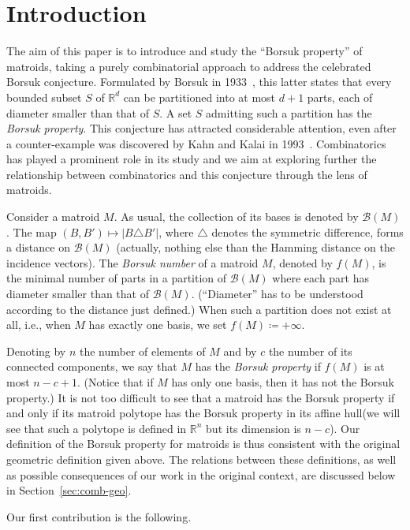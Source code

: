 \documentclass[12pt]{amsart}
\theoremstyle{plain}
\theoremstyle{definition}
\theoremstyle{remark}
\newcommand{\R}{\mathbb{R}}
\def \B {\mathcal{B}}
\begin{document}
\section{Introduction}\label{sec:intro}

The aim of this paper is to introduce and study the ``Borsuk property'' of matroids, taking a purely combinatorial approach to address the celebrated Borsuk conjecture. Formulated by Borsuk in 1933~\cite{borsuk1933drei}, this latter states that every bounded subset $S$ of $\R^d$ can be partitioned into at most $d+1$ parts, each of diameter smaller than that of $S$. A set $S$ admitting such a partition has the {\em Borsuk property}. This conjecture has attracted considerable attention, even after a counter-example was discovered by Kahn and Kalai in 1993~\cite{kahn1993counterexample}. Combinatorics has played a prominent role in its study and we aim at exploring further the relationship between combinatorics and this conjecture through the lens of matroids.

Consider a matroid $M$. As usual, the collection of its bases is denoted by $\B(M)$. The map $(B,B') \mapsto |B \triangle B'|$, where $\triangle$ denotes the symmetric difference, forms a distance on $\B(M)$ (actually, nothing else than the Hamming distance on the incidence vectors).  The {\em Borsuk number} of a matroid $M$, denoted by $f(M)$, is the minimal number of parts in a partition of $\B(M)$ where each part has diameter smaller than that of $\B(M)$. (``Diameter'' has to be understood according to the distance just defined.) When such a partition does not exist at all, i.e., when $M$ has exactly one basis, we set $f(M)\coloneqq +\infty$.

Denoting by $n$ the number of elements of $M$ and by $c$ the number of its connected components, we say that $M$ has the {\em Borsuk property} if $f(M)$ is at most $n-c+1$. (Notice that if $M$ has only one basis, then it has not the Borsuk property.) It is not too difficult to see that a matroid has the Borsuk property if and only if its matroid polytope has the Borsuk property in its affine hull(we will see that such a polytope is defined in $\R^n$ but its dimension is $n-c$). Our definition of the Borsuk property for matroids is thus consistent with the original geometric definition given above. The relations between these definitions, as well as possible consequences of our work in the original context, are discussed below in Section~\ref{sec:comb-geo}.

Our first contribution is the following.
\end{document}
